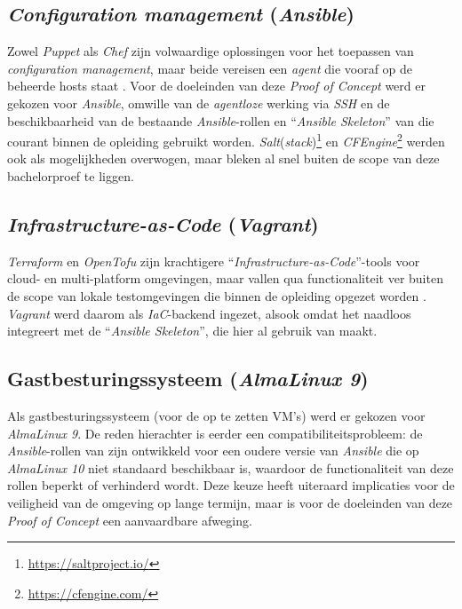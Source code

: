 \subsection{\emph{Configuration management} (\emph{Ansible})}%

Zowel \emph{Puppet} als \emph{Chef} zijn volwaardige oplossingen voor het toepassen van \emph{configuration management}, maar beide vereisen een \emph{agent} die vooraf op de beheerde hosts staat \autocite{Perforce2026a,ProgressSoftware2026}. Voor de doeleinden van deze \emph{Proof of Concept} werd er gekozen voor \emph{Ansible}, omwille van de \emph{agentloze} werking via \emph{SSH} en de beschikbaarheid van de bestaande \emph{Ansible}-rollen en ``\emph{Ansible Skeleton}'' van \textcite{Vreckem2025} die courant binnen de opleiding gebruikt worden. \emph{Salt}(\emph{stack})\footnote{\url{https://saltproject.io/}} en \emph{CFEngine}\footnote{\url{https://cfengine.com/}} werden ook als mogelijkheden overwogen, maar bleken al snel buiten de scope van deze bachelorproef te liggen.

\subsection{\emph{Infrastructure-as-Code} (\emph{Vagrant})}%

\emph{Terraform} en \emph{OpenTofu} zijn krachtigere ``\emph{Infrastructure-as-Code}''-tools voor cloud- en multi-platform omgevingen, maar vallen qua functionaliteit ver buiten de scope van lokale testomgevingen die binnen de opleiding opgezet worden \autocite{HashiCorp2026}. \emph{Vagrant} werd daarom als \emph{IaC}-backend ingezet, alsook omdat het naadloos integreert met de ``\emph{Ansible Skeleton}'', die hier al gebruik van maakt.

\subsection{Gastbesturingssysteem (\emph{AlmaLinux 9})}%

Als gastbesturingssysteem (voor de op te zetten VM's) werd er gekozen voor \emph{AlmaLinux 9}. De reden hierachter is eerder een compatibiliteitsprobleem: de \emph{Ansible}-rollen van \textcite{Vreckem2016} zijn ontwikkeld voor een oudere versie van \emph{Ansible} die op \emph{AlmaLinux 10} niet standaard beschikbaar is, waardoor de functionaliteit van deze rollen beperkt of verhinderd wordt. Deze keuze heeft uiteraard implicaties voor de veiligheid van de omgeving op lange termijn, maar is voor de doeleinden van deze \emph{Proof of Concept} een aanvaardbare afweging.

